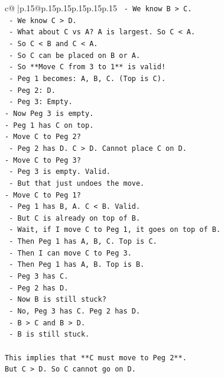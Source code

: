 \documentclass{article}
\begin{document}
{\begin{supertabular}{c@{$\;$}|p{.15\linewidth}@{}p{.15\linewidth}p{.15\linewidth}p{.15\linewidth}p{.15\linewidth}p{.15\linewidth}}
{{{\texttt{    {-} We know B > C.} \\
\texttt{    {-} We know C > D.} \\
\texttt{    {-} What about C vs A? A is largest. So C < A.} \\
\texttt{    {-} So C < B and C < A.} \\
\texttt{    {-} So C can be placed on B or A.} \\
\texttt{    {-} So **Move C from 3 to 1** is valid!} \\
\texttt{    {-} Peg 1 becomes: A, B, C. (Top is C).} \\
\texttt{    {-} Peg 2: D.} \\
\texttt{    {-} Peg 3: Empty.} \\
\texttt{{-} Now Peg 3 is empty.} \\
\texttt{{-} Peg 1 has C on top.} \\
\texttt{{-} Move C to Peg 2?} \\
\texttt{    {-} Peg 2 has D. C > D. Cannot place C on D.} \\
\texttt{{-} Move C to Peg 3?} \\
\texttt{    {-} Peg 3 is empty. Valid.} \\
\texttt{    {-} But that just undoes the move.} \\
\texttt{{-} Move C to Peg 1?} \\
\texttt{    {-} Peg 1 has B, A. C < B. Valid.} \\
\texttt{    {-} But C is already on top of B.} \\
\texttt{    {-} Wait, if I move C to Peg 1, it goes on top of B.} \\
\texttt{    {-} Then Peg 1 has A, B, C. Top is C.} \\
\texttt{    {-} Then I can move C to Peg 3.} \\
\texttt{    {-} Then Peg 1 has A, B. Top is B.} \\
\texttt{    {-} Peg 3 has C.} \\
\texttt{    {-} Peg 2 has D.} \\
\texttt{    {-} Now B is still stuck?} \\
\texttt{    {-} No, Peg 3 has C. Peg 2 has D.} \\
\texttt{    {-} B > C and B > D.} \\
\texttt{    {-} B is still stuck.} \\
\\ 
\texttt{This implies that **C must move to Peg 2**.} \\
\texttt{But C > D. So C cannot go on D.} \\
}}}
\end{supertabular}}
\end{document}
